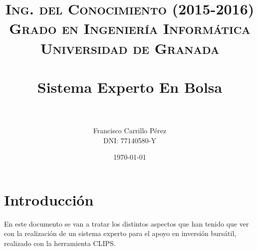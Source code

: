 
 \usepackage{algpseudocode}

\title{	
\normalfont \normalsize 
\textsc{{\bf Ing. del Conocimiento (2015-2016)} \\ Grado en Ingeniería Informática \\ Universidad de Granada} \\ [25pt] %
\horrule{0.5pt} \\[0.4cm] %
\huge Sistema Experto En Bolsa \\ %
\horrule{2pt} \\[0.5cm] %
}

\author{Francisco Carrillo Pérez \\DNI: 77140580-Y} %

\date{\normalsize\today} %




\maketitle %

\newpage %

\tableofcontents %

\listoffigures

\newpage

\section{Introducción }

En este documento se van a tratar los distintos aspectos que han tenido que ver con la realización de un sistema experto para el apoyo en inversión bursátil, realizado con la herramienta CLIPS.
